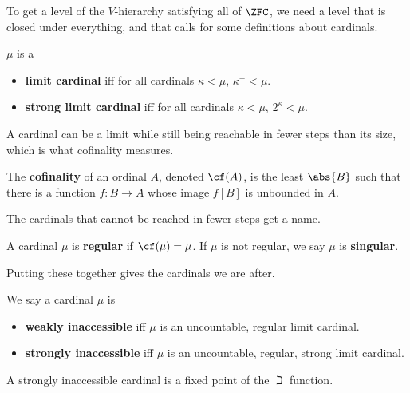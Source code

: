 To get a level of the $V$-hierarchy satisfying all of $\ZFC$, we need a level that is closed under everything, and that calls for some definitions about cardinals.

\begin{boxdefinition}
    $\mu$ is a
    \begin{itemize}
        \item \textbf{limit cardinal} iff for all cardinals $\kappa < \mu$, $\kappa^+ < \mu$.
        \item \textbf{strong limit cardinal} iff for all cardinals $\kappa < \mu$, $2^{\kappa} < \mu$.
    \end{itemize}
\end{boxdefinition}

A cardinal can be a limit while still being reachable in fewer steps than its size, which is what cofinality measures.

\begin{boxdefinition}[Cofinality]
    The \textbf{cofinality} of an ordinal $A$, denoted $\cf(A)$, is the least $\abs{B}$ such that there is a function $f : B \to A$ whose image $f[B]$ is unbounded in $A$.
\end{boxdefinition}

The cardinals that cannot be reached in fewer steps get a name.

\begin{boxdefinition}
    A cardinal $\mu$ is \textbf{regular} if $\cf(\mu) = \mu$. If $\mu$ is not regular, we say $\mu$ is \textbf{singular}.
\end{boxdefinition}

Putting these together gives the cardinals we are after.

\begin{boxdefinition}
    We say a cardinal $\mu$ is
    \begin{itemize}
        \item \textbf{weakly inaccessible} iff $\mu$ is an uncountable, regular limit cardinal.
        \item \textbf{strongly inaccessible} iff $\mu$ is an uncountable, regular, strong limit cardinal.
    \end{itemize}
\end{boxdefinition}

A strongly inaccessible cardinal is a fixed point of the $\beth$ function.

